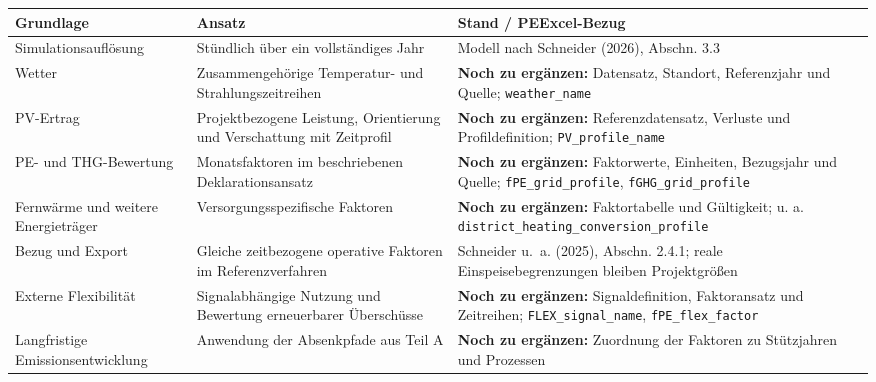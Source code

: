 \documentclass[
  ngerman,
  a4paper,
  DIV=11]{scrreprt}
\newcounter{none} %
\begin{document}
{\def\LTcaptype{none} %
\begin{longtable}[]{@{}
  >{\raggedright\arraybackslash}p{}
  >{\raggedright\arraybackslash}p{}
  >{\raggedright\arraybackslash}p{}@{}}
\toprule\noalign{}
\begin{minipage}[b]{\linewidth}\raggedright
Grundlage
\end{minipage} & \begin{minipage}[b]{\linewidth}\raggedright
Ansatz
\end{minipage} & \begin{minipage}[b]{\linewidth}\raggedright
Stand / PEExcel-Bezug
\end{minipage} \\
\midrule\noalign{}
\endhead
\bottomrule\noalign{}
\endlastfoot
Simulationsauflösung & Stündlich über ein vollständiges Jahr & Modell
nach Schneider (2026), Abschn. 3.3 \\
Wetter & Zusammengehörige Temperatur- und Strahlungszeitreihen &
\textbf{Noch zu ergänzen:} Datensatz, Standort, Referenzjahr und Quelle;
\texttt{weather\_name} \\
PV-Ertrag & Projektbezogene Leistung, Orientierung und Verschattung mit
Zeitprofil & \textbf{Noch zu ergänzen:} Referenzdatensatz, Verluste und
Profildefinition; \texttt{PV\_profile\_name} \\
PE- und THG-Bewertung & Monatsfaktoren im beschriebenen
Deklarationsansatz & \textbf{Noch zu ergänzen:} Faktorwerte, Einheiten,
Bezugsjahr und Quelle; \texttt{fPE\_grid\_profile},
\texttt{fGHG\_grid\_profile} \\
Fernwärme und weitere Energieträger & Versorgungsspezifische Faktoren &
\textbf{Noch zu ergänzen:} Faktortabelle und Gültigkeit; u. a.
\texttt{district\_heating\_conversion\_profile} \\
Bezug und Export & Gleiche zeitbezogene operative Faktoren im
Referenzverfahren & Schneider u.~a. (2025), Abschn. 2.4.1; reale
Einspeisebegrenzungen bleiben Projektgrößen \\
Externe Flexibilität & Signalabhängige Nutzung und Bewertung
erneuerbarer Überschüsse & \textbf{Noch zu ergänzen:} Signaldefinition,
Faktoransatz und Zeitreihen; \texttt{FLEX\_signal\_name},
\texttt{fPE\_flex\_factor} \\
Langfristige Emissionsentwicklung & Anwendung der Absenkpfade aus Teil A
& \textbf{Noch zu ergänzen:} Zuordnung der Faktoren zu Stützjahren und
Prozessen \\
\end{longtable}
}
\end{document}
